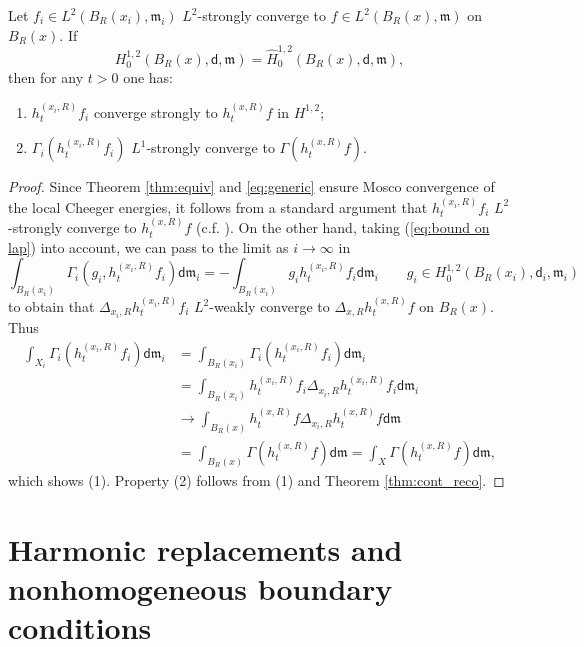 \documentclass[a4paper,11pt,reqno]{article}
\numberwithin{equation}{section}
\theoremstyle{plain}
\theoremstyle{definition}
\theoremstyle{remark}
\newcommand{\dist}{\mathsf{d}}
\newcommand{\meas}{\mathfrak{m}}
\begin{document}
{\begin{proposition}\label{prop:conv heat flow}
Let  $f_i \in L^2(B_R(x_i), \meas_i)$ $L^2$-strongly converge to $f \in L^2(B_R(x), \meas)$ on $B_R(x)$. 
If
\begin{equation}\label{eq:generic}
H^{1, 2}_0(B_R(x), \dist, \meas)=\hat{H}^{1, 2}_0(B_R(x), \dist, \meas),
\end{equation}
then for any $t>0$ one has:
\begin{enumerate}
\item[(1)] $h_t^{(x_i, R)}f_i$ converge strongly to $h_t^{(x, R)}f$ in $H^{1, 2}$;
\item[(2)] $\Gamma_i (h_t^{(x_i, R)}f_i)$ $L^1$-strongly converge to $\Gamma(h_t^{(x, R)}f)$.
\end{enumerate}
\end{proposition}
\begin{proof} Since Theorem \ref{thm:equiv} and \eqref{eq:generic} ensure Mosco convergence of the local Cheeger energies, 
it follows from a standard argument that $h_t^{(x_i, R)}f_i$ $L^2$-strongly converge to $h_t^{(x, R)}f$ (c.f. \cite{GigliMondinoSavare13, KuwaeShioya03}).
On the other hand, taking (\ref{eq:bound on lap}) into account, we can pass to the limit as $i\to\infty$ in
$$
\int_{B_R(x_i)}\Gamma_i(g_i,h_t^{(x_i,R)}f_i)\dist\meas_i
=-\int_{B_R(x_i)}g_ih_t^{(x_i,R)}f_i\dist\meas_i\qquad g_i\in H^{1,2}_0(B_R(x_i),\dist_i,\meas_i)
$$
to obtain that $\Delta_{x_i,R} h_t^{(x_i, R)}f_i$ $L^2$-weakly converge to $\Delta_{x,R} h_t^{(x, R)}f$ on $B_R(x)$.
Thus 
\begin{align}\label{eq:oo}
\int_{X_i}\Gamma_i(h^{(x_i, R)}_tf_i)\dist \meas_i&=\int_{B_R(x_i)}\Gamma_i(h^{(x_i, R)}_tf_i)\dist \meas_i \nonumber \\
&=\int_{B_R(x_i)}h_t^{(x_i, R)}f_i\Delta_{x_i,R} h_t^{(x_i, R)}f_i\dist \meas_i \nonumber \\
&\to \int_{B_R(x)}h_t^{(x, R)}f\Delta_{x_i,R} h_t^{(x, R)}f\dist \meas \nonumber \\
&=\int_{B_R(x)}\Gamma(h_t^{(x, R)}f)\dist \meas=\int_{X}\Gamma(h_t^{(x, R)}f)\dist \meas,
\end{align}
which shows (1). Property (2) follows from (1) and Theorem \ref{thm:cont_reco}.
\end{proof}


\section{Harmonic replacements and nonhomogeneous boundary conditions}\label{sec:3}

}
\end{document}
